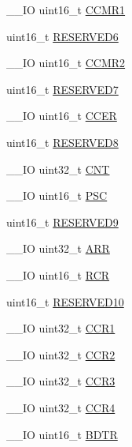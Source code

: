 \begin{DoxyCompactItemize}
\item 
\-\_\-\-\_\-\-I\-O uint16\-\_\-t \hyperlink{struct_t_i_m___type_def_a90d89aec51d8012b8a565ef48333b24b}{C\-C\-M\-R1}
\item 
uint16\-\_\-t \hyperlink{struct_t_i_m___type_def_aab502dde158ab7da8e7823d1f8a06edb}{R\-E\-S\-E\-R\-V\-E\-D6}
\item 
\-\_\-\-\_\-\-I\-O uint16\-\_\-t \hyperlink{struct_t_i_m___type_def_a977b3cf310388b5ad02440d64d03810a}{C\-C\-M\-R2}
\item 
uint16\-\_\-t \hyperlink{struct_t_i_m___type_def_ab1820c97e368d349f5f4121f015d9fab}{R\-E\-S\-E\-R\-V\-E\-D7}
\item 
\-\_\-\-\_\-\-I\-O uint16\-\_\-t \hyperlink{struct_t_i_m___type_def_ab1da3e84848ed66e0577c87c199bfb6d}{C\-C\-E\-R}
\item 
uint16\-\_\-t \hyperlink{struct_t_i_m___type_def_afc22764fbf9ee7ce28174d65d0260f18}{R\-E\-S\-E\-R\-V\-E\-D8}
\item 
\-\_\-\-\_\-\-I\-O uint32\-\_\-t \hyperlink{struct_t_i_m___type_def_a6095a27d764d06750fc0d642e08f8b2a}{C\-N\-T}
\item 
\-\_\-\-\_\-\-I\-O uint16\-\_\-t \hyperlink{struct_t_i_m___type_def_aba5df4ecbb3ecb97b966b188c3681600}{P\-S\-C}
\item 
uint16\-\_\-t \hyperlink{struct_t_i_m___type_def_ad8b1fadb520f7a200ee0046e110edc79}{R\-E\-S\-E\-R\-V\-E\-D9}
\item 
\-\_\-\-\_\-\-I\-O uint32\-\_\-t \hyperlink{struct_t_i_m___type_def_af17f19bb4aeea3cc14fa73dfa7772cb8}{A\-R\-R}
\item 
\-\_\-\-\_\-\-I\-O uint16\-\_\-t \hyperlink{struct_t_i_m___type_def_aa0663aab6ed640b7594c8c6d32f6c1cd}{R\-C\-R}
\item 
uint16\-\_\-t \hyperlink{struct_t_i_m___type_def_ad68efe7a323ac2fcb823a26c0c51445b}{R\-E\-S\-E\-R\-V\-E\-D10}
\item 
\-\_\-\-\_\-\-I\-O uint32\-\_\-t \hyperlink{struct_t_i_m___type_def_adab1e24ef769bbcb3e3769feae192ffb}{C\-C\-R1}
\item 
\-\_\-\-\_\-\-I\-O uint32\-\_\-t \hyperlink{struct_t_i_m___type_def_ab90aa584f07eeeac364a67f5e05faa93}{C\-C\-R2}
\item 
\-\_\-\-\_\-\-I\-O uint32\-\_\-t \hyperlink{struct_t_i_m___type_def_a27a478cc47a3dff478555ccb985b06a2}{C\-C\-R3}
\item 
\-\_\-\-\_\-\-I\-O uint32\-\_\-t \hyperlink{struct_t_i_m___type_def_a85fdb75569bd7ea26fa48544786535be}{C\-C\-R4}
\item 
\-\_\-\-\_\-\-I\-O uint16\-\_\-t \hyperlink{struct_t_i_m___type_def_a112c0403ac38905a70cf5aaa9c8cc38a}{B\-D\-T\-R}

\end{DoxyCompactItemize}
